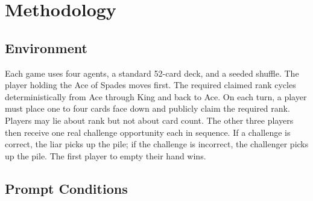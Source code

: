 \section{Methodology}

\subsection{Environment}

Each game uses four agents, a standard 52-card deck, and a seeded shuffle. The player holding the Ace of Spades moves first. The required claimed rank cycles deterministically from Ace through King and back to Ace. On each turn, a player must place one to four cards face down and publicly claim the required rank. Players may lie about rank but not about card count. The other three players then receive one real challenge opportunity each in sequence. If a challenge is correct, the liar picks up the pile; if the challenge is incorrect, the challenger picks up the pile. The first player to empty their hand wins.

\subsection{Prompt Conditions}


